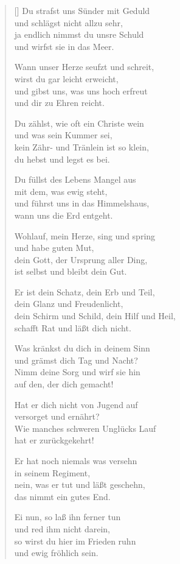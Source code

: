 \begin{multicols}{2}
\begin{verse}[\versewidth]
 Du strafst uns Sünder mit Geduld\\
und schlägst nicht allzu sehr,\\
ja endlich nimmst du unsre Schuld\\
und wirfst sie in das Meer.

 Wann unser Herze seufzt und schreit,\\
wirst du gar leicht erweicht,\\
und gibst uns, was uns hoch erfreut\\
und dir zu Ehren reicht.

 Du zählst, wie oft ein Christe wein\\
und was sein Kummer sei,\\
kein Zähr- und Tränlein ist so klein,\\
du hebst und legst es bei.

 Du füllst des Lebens Mangel aus\\
mit dem, was ewig steht,\\
und führst uns in das Himmelshaus,\\
wann uns die Erd entgeht.

 Wohlauf, mein Herze, sing und spring\\
und habe guten Mut,\\
dein Gott, der Ursprung aller Ding,\\
ist selbst und bleibt dein Gut.

 Er ist dein Schatz, dein Erb und Teil,\\
dein Glanz und Freudenlicht,\\
dein Schirm und Schild, dein Hilf und Heil,\\
schafft Rat und läßt dich nicht.

 Was kränkst du dich in deinem Sinn\\
und grämst dich Tag und Nacht?\\
Nimm deine Sorg und wirf sie hin\\
auf den, der dich gemacht!

 Hat er dich nicht von Jugend auf\\
versorget und ernährt?\\
Wie manches schweren Unglücks Lauf\\
hat er zurückgekehrt!

 Er hat noch niemals was versehn\\
in seinem Regiment,\\
nein, was er tut und läßt geschehn,\\
das nimmt ein gutes End.

 Ei nun, so laß ihn ferner tun\\
und red ihm nicht darein,\\
so wirst du hier im Frieden ruhn\\
und ewig fröhlich sein.
    
\end{verse}
\end{multicols}

